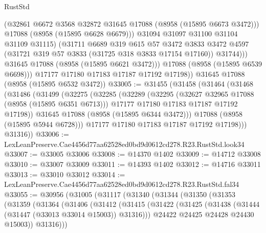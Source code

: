 \begin{lexlean}{RustStd}
\begin{coremodule}
                    (@32861 @6672 @3568 @32872 @31645 @17088 (@8958 (@15895 @6673 @3472)))
                    @17088
                    (@8958 (@15895 @6628 @6679)))
                  @31094
                  @31097
                  @31100
                  @31104
                  @31109
                  @31115)
                (@31711
                  @6689
                  @319
                  @615
                  @57
                  @3472
                  @3833
                  @3472
                  @4597
                  (@31721 @319 @57 @3833 (@31725 @318 @3833 @17154 @17160))
                  @31744)))
            @31645
            @17088
            (@8958 (@15895 @6621 @3472)))
          @17088
          (@8958 (@15895 @6539 @6698)))
        @17177
        @17180
        @17183
        @17187
        @17192
        @17198))
    @31645
    @17088
    (@8958 (@15895 @6532 @3472))
@33005 := @31455
    (@31458
      (@31464
        (@31468
          (@31486
            (@31499
              (@32275
                (@32285
                  (@32289
                    (@32295
                      (@32627 @32965 @17088 (@8958 (@15895 @6351 @6713)))
                      @17177
                      @17180
                      @17183
                      @17187
                      @17192
                      @17198))
                  @31645
                  @17088
                  (@8958 (@15895 @6344 @3472)))
                @17088
                (@8958 (@15895 @5944 @6728)))
              @17177
              @17180
              @17183
              @17187
              @17192
              @17198)))
        @31316))
@33006 := LexLeanPreserve.Cae4456d77aa62528ed0bd9d0612cd278.R23.RustStd.look34
@33007 := @33005 @33006
@33008 := @14370 @1402
@33009 := @14712 @33008
@33010 := @33007 @33009
@33011 := @14393 @1402
@33012 := @14716 @33011
@33013 := @33010 @33012
@33014 := LexLeanPreserve.Cae4456d77aa62528ed0bd9d0612cd278.R23.RustStd.fal34
@33055 := @30956
    (@31005
      (@31117
        (@31340
          (@31344
            (@31350
              (@31353
                (@31359
                  (@31364
                    (@31406
                      (@31412
                        (@31415
                          (@31422
                            (@31425 (@31438 (@31444 (@31447 (@33013 @33014 @15003)) @31316)))
                            @24422
                            @24425
                            @24428
                            @24430
                            @15003))
                        @31316)))

\end{coremodule}
\end{lexlean}
